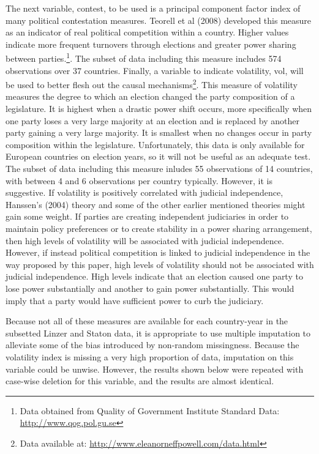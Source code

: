 \documentclass[12pt]{article}
\begin{document}
The next variable, contest, to be used is a principal component factor index of many political contestation measures. Teorell et al (2008) developed this measure as an indicator of real political competition within a country. Higher values indicate more frequent turnovers through elections and greater power sharing between parties.\footnote{Data obtained from Quality of Government Institute Standard Data: \url{http://www.qog.pol.gu.se}}. The subset of data including this measure includes 574 observations over 37 countries. Finally, a variable to indicate volatility, vol, will be used to better flesh out the causal mechanisms\footnote{Data available at: \url{http://www.eleanorneffpowell.com/data.html}}. This measure of volatility measures the degree to which an election changed the party composition of a legislature. It is highest when a drastic power shift occurs, more specifically when one party loses a very large majority at an election and is replaced by another party gaining a very large majority. It is smallest when no changes occur in party composition within the legislature. Unfortunately, this data is only available for European countries on election years, so it will not be useful as an adequate test. The subset of data including this measure inludes 55 observations of 14 countries, with between 4 and 6 observations per country typically. However, it is suggestive. If volatility is positively correlated with judicial independence, Hanssen's (2004) theory and some of the other earlier mentioned theories might gain some weight. If parties are creating independent judiciaries in order to maintain policy preferences or to create stability in a power sharing arrangement, then high levels of volatility will be associated with judicial independence. However, if instead political competition is linked to judicial independence in the way proposed by this paper, high levels of volatility should not be associated with judicial independence. High levels indicate that an election caused one party to lose power substantially and another to gain power substantially. This would imply that a party would have sufficient power to curb the judiciary.

Because not all of these measures are available for each country-year in the subsetted Linzer and Staton data, it is appropriate to use multiple imputation to alleviate some of the bias introduced by non-random missingness. Because the volatility index is missing a very high proportion of data, imputation on this variable could be unwise. However, the results shown below were repeated with case-wise deletion for this variable, and the results are almost identical.
\end{document}
